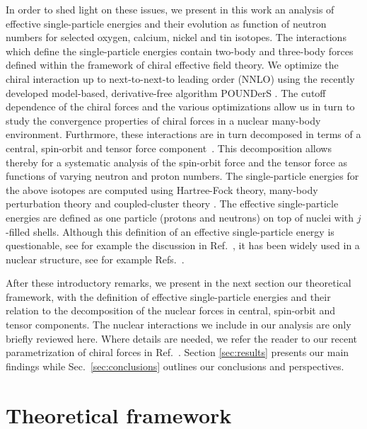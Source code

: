 \documentclass[aps,showpacs,floatfix,nofootinbib,preprintnumbers,superscriptaddress,amsmath,amssymb]{revtex4-1}
\begin{document}
In order to shed light on these issues, we present in this work an
analysis of effective single-particle energies and their evolution as
function of neutron numbers for selected oxygen, calcium, nickel and
tin isotopes. The interactions which define the single-particle
energies contain two-body and three-body forces defined within the
framework of chiral effective field theory.  We optimize the chiral
interaction up to next-to-next-to leading order (NNLO) using the
recently developed model-based, derivative-free algorithm POUNDerS
\cite{taoman}.  The cutoff dependence of the chiral forces and the
various optimizations allow us in turn to study the convergence
properties of chiral forces in a nuclear many-body
environment. Furthrmore, these interactions are in turn decomposed in
terms of a central, spin-orbit and tensor force
component~\cite{elliott1968,kirson1973,brown1988,osnes1992,richter1991,smirnova2010}. This
decomposition allows thereby for a systematic analysis of the
spin-orbit force and the tensor force as functions of varying neutron
and proton numbers.  The single-particle energies for the above
isotopes are computed using Hartree-Fock theory, many-body
perturbation theory and coupled-cluster theory
\cite{shavittbartlett2009}. The effective single-particle energies are defined
as one particle (protons and neutrons) on top of nuclei with
$j$-filled shells. Although this definition of an effective single-particle
energy is questionable, see for example the discussion in
Ref.~\cite{duguet2012}, it has been widely used in a 
nuclear structure, see for example
Refs.~\cite{otsuka2005,otsuka2010b,smirnova2010,nowacki2012,smirnova2012,sorlin2008}.

After these introductory remarks, we present in the next section our
theoretical framework, with the definition of effective
single-particle energies and their relation to the decomposition of
the nuclear forces in central, spin-orbit and tensor components. The
nuclear interactions we include in our analysis are only briefly
reviewed here. Where details are needed, we refer the reader to our
recent parametrization of chiral forces in
Ref.~\cite{carlsson2014}. Section \ref{sec:results} presents our main
findings while Sec.~\ref{sec:conclusions} outlines our conclusions
and perspectives.






 
\section{Theoretical framework}\label{sec:formalism}
\end{document}
